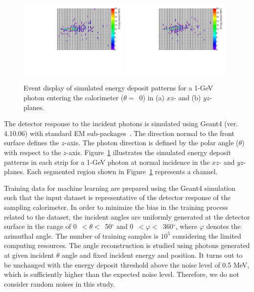 \documentclass[12pt,times,draftclsnofoot,a4paper]{elsarticle}
\begin{document}
\begin{figure}[!hbt]
\centering
\includegraphics[width=0.48\textwidth]{Fig2_EMShower_XZ.pdf}
\includegraphics[width=0.48\textwidth]{Fig2_EMShower_YZ.pdf}
\caption{ Event display of simulated energy deposit patterns for a 1-GeV photon entering the calorimeter ($\theta=$~0) in (a) $xz$- and (b) $yz$-planes.}
\label{fig:Evt_Dis}
\end{figure}

The detector response to the incident photons is simulated using Geant4 (ver. 4.10.06) with standard EM sub-packages~\cite{GEANT4}. The direction normal to the front surface defines the $z$-axis. The photon direction is defined by the polar angle ($\theta$) with respect to the $z$-axis. Figure~\ref{fig:Evt_Dis} illustrates the simulated energy deposit patterns in each strip for a 1-GeV photon at normal incidence in the $xz$- and $yz$-planes. Each segmented region shown in Figure~\ref{fig:Evt_Dis} represents a channel. 

Training data for machine learning are prepared using the Geant4 simulation such that the input dataset is representative of the detector response of the sampling calorimeter. In order to minimize the bias in the training process related to the dataset, the incident angles are uniformly generated at the detector surface in the range of 0~$<\theta<$~50$^{\circ}$ and 0~$<\varphi<$~360$^{\circ}$, where $\varphi$ denotes the azimuthal angle. The number of training samples is $10^{5}$ considering the limited computing resources. The angle reconstruction is studied using photons generated at given incident $\theta$ angle and fixed incident energy and position. It turns out to be unchanged with the energy deposit threshold above the noise level of 0.5 MeV, which is sufficiently higher than the expected noise level. Therefore, we do not consider random noises in this study.
\end{document}
